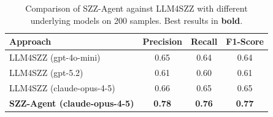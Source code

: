 \begin{table}[t]
\centering
\caption{Comparison of SZZ-Agent against LLM4SZZ with different underlying models on 200 samples. Best results in \textbf{bold}.}
\label{tab:results_models}
\begin{tabular}{lccc}
\toprule
\textbf{Approach} & \textbf{Precision} & \textbf{Recall} & \textbf{F1-Score} \\
\midrule
LLM4SZZ (gpt-4o-mini) & 0.65 & 0.64 & 0.64 \\
LLM4SZZ (gpt-5.2) & 0.61 & 0.60 & 0.61 \\
LLM4SZZ (claude-opus-4-5) & 0.66 & 0.65 & 0.65 \\
\midrule
\rowcolor{gray!20} \textbf{SZZ-Agent (claude-opus-4-5)} & \textbf{0.78} & \textbf{0.76} & \textbf{0.77} \\
\bottomrule
\end{tabular}
\end{table}
